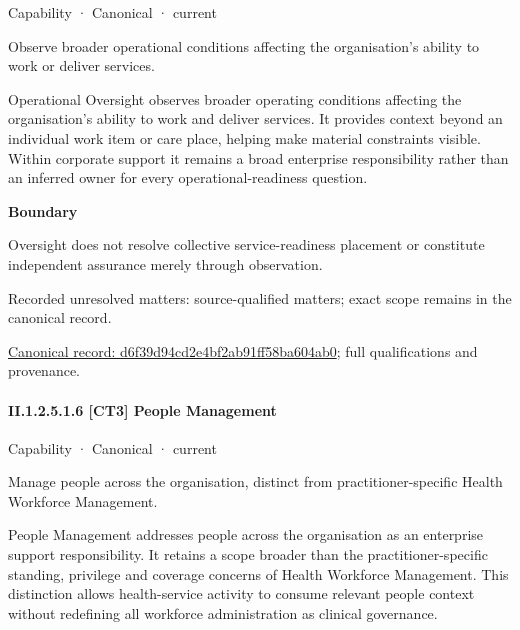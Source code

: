 \label{element:d6f39d94cd2e4bf2ab91ff58ba604ab0}
{\small Capability · Canonical · current}\par

Observe broader operational conditions affecting the organisation’s ability to work or deliver services.



Operational Oversight observes broader operating conditions affecting the organisation's ability to work and deliver services. It provides context beyond an individual work item or care place, helping make material constraints visible. Within corporate support it remains a broad enterprise responsibility rather than an inferred owner for every operational-readiness question.



\textbf{Boundary}



Oversight does not resolve collective service-readiness placement or constitute independent assurance merely through observation.


{\small Recorded unresolved matters: source-qualified matters; exact scope remains in the canonical record.}\par
{\footnotesize \href{../../../../../../../continuum/strategy/capability/d6f39d94cd2e4bf2ab91ff58ba604ab0.md}{Canonical record: d6f39d94cd2e4bf2ab91ff58ba604ab0}; full qualifications and provenance.}\par
\paragraph*{II.1.2.5.1.6 [CT3] People Management}
\label{navigation:II.1.2.5.1.6}

\label{element:df8b9d309b354efcb15991b3d75ed852}
{\small Capability · Canonical · current}\par

Manage people across the organisation, distinct from practitioner-specific Health Workforce Management.



People Management addresses people across the organisation as an enterprise support responsibility. It retains a scope broader than the practitioner-specific standing, privilege and coverage concerns of Health Workforce Management. This distinction allows health-service activity to consume relevant people context without redefining all workforce administration as clinical governance.



